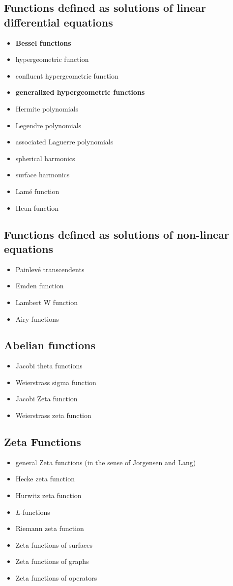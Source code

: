 \documentclass[12pt]{article}
\begin{document}
\subsection{Functions defined as solutions of linear differential equations}
\begin{itemize}
\item {\bf Bessel functions}
\item hypergeometric function
\item confluent hypergeometric function
\item {\bf generalized hypergeometric functions}
\item Hermite polynomials
\item Legendre polynomials
\item associated Laguerre polynomials
\item spherical harmonics
\item surface harmonics
\item Lam\'e function
\item Heun function
\end{itemize}

\subsection{Functions defined as solutions of non-linear equations}
\begin{itemize}
\item Painlev\'e transcendents
\item Emden function
\item Lambert W function 
\item Airy functions
\end{itemize}

\subsection{Abelian functions}
\begin{itemize}
\item Jacobi theta functions
\item Weierstrass sigma function
\item Jacobi Zeta function
\item Weierstrass zeta function
\end{itemize}

\subsection{Zeta Functions}
\begin{itemize}
\item general Zeta functions (in the sense of Jorgensen and Lang)
\item Hecke zeta function
\item Hurwitz zeta function
\item $L$-functions
\item Riemann zeta function
\item Zeta functions of surfaces
\item Zeta functions of graphs
\item Zeta functions of operators
\end{itemize}
\end{document}
